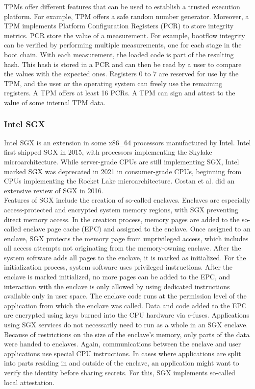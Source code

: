 TPMs offer different features that can be used to establish a trusted execution
platform. For example, TPM offers a safe random number generator. Moreover, a
TPM implements Platform Configuration Registers (PCR) to store integrity
metrics. PCR store the value of a measurement. For example, bootflow integrity
can be verified by performing multiple measurements, one for each stage in the
boot chain. With each measurement, the loaded code is part of the resulting
hash. This hash is stored in a PCR and can then be read by a user to compare the
values with the expected ones. Registers 0 to 7 are reserved for use by the TPM,
and the user or the operating system can freely use the remaining registers. A
TPM offers at least 16 PCRs. A TPM can sign and attest to the value of some
internal TPM data. \\

\subsubsection{Intel SGX}
\label{sec:20:sgx}
Intel SGX is an extension in some x86\_64 processors manufactured by Intel.
Intel first shipped SGX in 2015, with processors implementing the Skylake
microarchitecture. While server-grade CPUs are still implementing SGX, Intel
marked SGX was deprecated in 2021 in consumer-grade CPUs, beginning from CPUs
implementing the Rocket Lake microarchitecture. Costan et al. did an extensive
review of SGX in 2016.\cite{costan2016intel} \\

Features of SGX include the creation of so-called enclaves. Enclaves are
especially access-protected and encrypted system memory regions, with SGX
preventing direct memory access. In the creation process, memory pages are added
to the so-called enclave page cache (EPC) and assigned to the enclave. Once
assigned to an enclave, SGX protects the memory page from unprivileged access,
which includes all access attempts not originating from the memory-owning
enclave. After the system software adds all pages to the enclave, it is marked
as initialized. For the initialization process, system software uses privileged
instructions. After the enclave is marked initialized, no more pages can be
added to the EPC, and interaction with the enclave is only allowed by using
dedicated instructions available only in user space. The enclave code runs at
the permission level of the application from which the enclave was called. Data
and code added to the EPC are encrypted using keys burned into the CPU hardware
via e-fuses. Applications using SGX services do not necessarily need to run as a
whole in an SGX enclave. Because of restrictions on the size of the enclave's
memory, only parts of the data were handed to enclaves. Again, communications
between the enclave and user applications use special CPU instructions. In cases
where applications are split into parts residing in and outside of the enclave,
an application might want to verify the identity before sharing secrets. For
this, SGX implements so-called local attestation.\\

